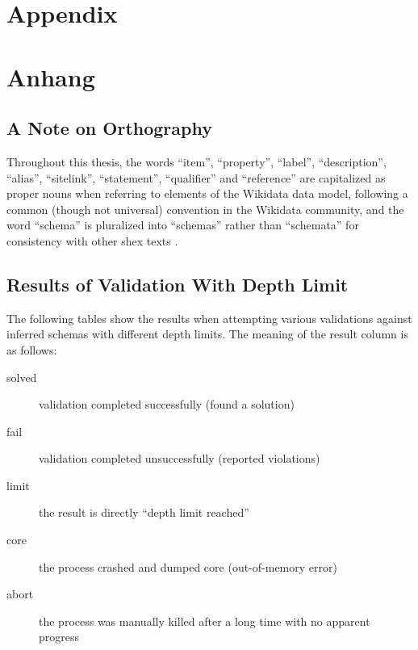 
{\chapter{Appendix}}    %
{\chapter{Anhang}}      %
\label{chap:appendix}

\section{A Note on Orthography}

Throughout this thesis,
the words “\gls{item}”, “\gls{property}”,
“\gls{label}”, “\gls{description}”, “\gls{alias}”,
“\gls{sitelink}”,
“\gls{statement}”, “\gls{qualifier}” and “\gls{reference}”
are capitalized as proper nouns when referring to elements of the \gls{Wikidata} data model,
following a common (though not universal) convention in the \gls{Wikidata} community,
and the word “\gls{schema}” is pluralized into “\glspl{schema}”
rather than “schemata”
for consistency with other \gls{shex} texts \cite{shex,shex-primer}.

\section{Results of Validation With Depth Limit}
\label{sec:appendix:depth-limit}

The following tables show the results
when attempting various validations against inferred \glspl{schema}
with different depth limits.
The meaning of the result column is as follows:

\begin{description}
\item[solved] validation completed successfully (found a solution)
\item[fail] validation completed unsuccessfully (reported violations)
\item[limit] the result is directly “depth limit reached”
\item[core] the process crashed and dumped core (out-of-memory error)
\item[abort] the process was manually killed after a long time with no apparent progress
\end{description}

